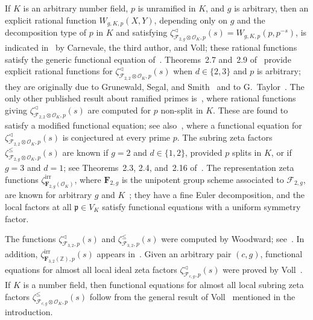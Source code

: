 \documentclass[11pt,a4paper]{amsart}
\theoremstyle{plain}
\theoremstyle{remark}
\newcommand{\Z}{\mathbb{Z}}
\newcommand{\tensor}{\otimes}
\newcommand{\p}{\mathfrak{p}}
\def \p {\ensuremath{\mathfrak{p}}}
\begin{document}
If $K$ is an arbitrary number field, $p$ is unramified in $K$, and $g$ is arbitrary, then an explicit 
rational function $W_{g,K,p}(X,Y)$, depending only on $g$ and the decomposition type of $p$ in $K$ and satisfying $\zeta^\vartriangleleft_{\mathcal{F}_{2,g} \tensor \mathcal{O}_K,p}(s) = W_{g,K,p}(p,p^{-s})$, is indicated in~\cite[Section~5.2]{CSV/19} by Carnevale, the third author, and Voll; these rational functions satisfy the generic functional equation of~\cite[Theorem~C]{Voll/10}.  Theorems~2.7 and~2.9 of~\cite{duSWoodward/08} provide explicit rational functions for $\zeta^\vartriangleleft_{\mathcal{F}_{2,2} \tensor \mathcal{O}_K,p}(s)$ when $d \in \{ 2,3 \}$ and $p$ is arbitrary; they are originally due to Grunewald, Segal, and Smith~\cite{GSS/88} and to G.~Taylor~\cite{Taylor/01}.  The only other published result about ramified primes is~\cite[Theorem~3.8]{SV2/16}, where rational functions giving $\zeta^\vartriangleleft_{\mathcal{F}_{2,2} \tensor \mathcal{O}_K,p}(s)$ are computed for $p$ non-split in $K$.  These are found to satisfy a modified functional equation; see also~\cite[Conjecture~1.4]{SV1/15}, where a functional equation for $\zeta^\vartriangleleft_{\mathcal{F}_{2,2} \tensor \mathcal{O}_K,p}(s)$ is conjectured at every prime $p$.  The subring zeta factors $\zeta^\leq_{\mathcal{F}_{2,g} \tensor \mathcal{O}_K,p}(s)$ are known if $g = 2$ and $d \in \{1, 2 \}$, provided $p$ splits in $K$, or if $g = 3$ and $d = 1$; see Theorems~2.3, 2.4, and~2.16 of~\cite{duSWoodward/08}.  The representation zeta functions $\zeta^{\mathrm{irr}}_{\mathbf{F}_{2,g}(\mathcal{O}_K)}$, where $\mathbf{F}_{2,g}$ is the unipotent group scheme associated to $\mathcal{F}_{2,g}$, are known for arbitrary $g$ and $K$~\cite[Theorem~B]{StasinskiVoll/14}; they have a fine Euler decomposition, and the local factors at all $\p \in V_K$ satisfy functional equations with a uniform symmetry factor.

The functions $\zeta^\vartriangleleft_{\mathcal{F}_{3,2},p}(s)$ and $\zeta^\leq_{\mathcal{F}_{3,2},p}(s)$ were computed by Woodward; see~\cite[Theorem~2.35]{duSWoodward/08}.  In addition, $\zeta^{\mathrm{irr}}_{\mathbf{F}_{3,2}(\Z),p}(s)$ appears in~\cite[Table~5.1]{Ezzat/thesis}.  Given an arbitrary pair $(c,g)$, functional equations for almost all local ideal zeta factors $\zeta^\vartriangleleft_{\mathcal{F}_{c,g},p}(s)$ were proved by Voll~\cite[Theorem~4.4]{Voll/17}.  If $K$ is a number field, then functional equations for almost all local subring zeta factors $\zeta^\leq_{\mathcal{F}_{c,g} \tensor \mathcal{O}_K,p}(s)$ follow from the general result of Voll~\cite[Corollary~1.1]{Voll/10} mentioned in the introduction.
\end{document}

